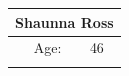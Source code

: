             {\raggedright

            \vspace{3pt} \noindent
            \begin{tabular}{|p{140pt}|p{78pt}|p{207pt}|}
            \hline
            \multicolumn{3}{|c|}{\parbox{426pt}{\centering
            Shaunna Ross
            }} \\
            \hline
            \parbox{140pt}{\raggedright {}} & \parbox{78pt}{\raggedright
            Age:
            } & \parbox{207pt}{\raggedright
            46
            } \\
             & \parbox{78pt}{\raggedright
}
\end{tabular}}
